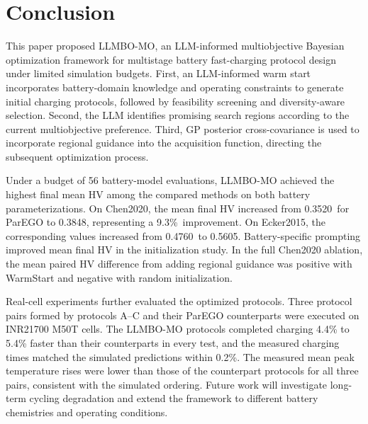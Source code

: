 \documentclass[lettersize,journal]{IEEEtran}
\newcommand{\ChenLLMBOMean}{0.3848}
\newcommand{\ChenParEGOMean}{0.3520}
\newcommand{\ChenFinalGain}{9.3\%}
\newcommand{\EckerParEGOMean}{0.4760}
\newcommand{\EckerLLMBOMean}{0.5605}
\begin{document}


\section{Conclusion}
\label{sec:conclusion}

This paper proposed LLMBO-MO, an LLM-informed multiobjective
Bayesian optimization framework for multistage battery
fast-charging protocol design under limited simulation budgets.
First, an LLM-informed warm start incorporates battery-domain
knowledge and operating constraints to generate initial charging
protocols, followed by feasibility screening and diversity-aware
selection. Second, the LLM identifies promising search regions
according to the current multiobjective preference. Third,
GP posterior cross-covariance is used to incorporate regional
guidance into the acquisition function, directing the subsequent
optimization process.

Under a budget of 56 battery-model evaluations, LLMBO-MO
achieved the highest final mean HV among the compared methods
on both battery parameterizations. On Chen2020, the mean final
HV increased from \ChenParEGOMean\ for ParEGO to
\ChenLLMBOMean, representing a \ChenFinalGain\ improvement.
On Ecker2015, the corresponding values increased from
\EckerParEGOMean\ to \EckerLLMBOMean.
Battery-specific prompting improved mean final HV in the initialization
study. In the full Chen2020 ablation, the mean paired HV difference from
adding regional guidance was positive with WarmStart and negative with
random initialization.

Real-cell experiments further evaluated the optimized
protocols. Three protocol pairs formed by protocols A--C
and their ParEGO counterparts were executed on INR21700
M50T cells. The LLMBO-MO protocols completed charging
4.4\% to 5.4\% faster than their counterparts in every
test, and the measured charging times matched the
simulated predictions within 0.2\%. The measured mean
peak temperature rises were lower than those of the
counterpart protocols for all three pairs, consistent
with the simulated ordering.
Future work will investigate long-term cycling degradation
and extend the framework to different battery chemistries
and operating conditions.
\end{document}
